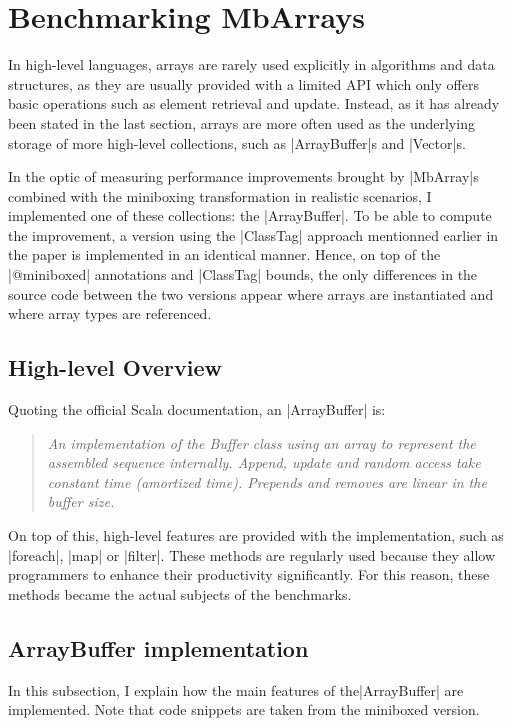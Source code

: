\section{Benchmarking MbArrays}
\label{sec:bench}

In high-level languages, arrays are rarely used explicitly in algorithms and data structures, as they are usually provided with a limited API which only offers basic operations such as element retrieval and update. Instead, as it has already been stated in the last section, arrays are more often used as the underlying storage of more high-level collections, such as |ArrayBuffer|s and |Vector|s.

In the optic of measuring performance improvements brought by |MbArray|s combined with the miniboxing transformation in realistic scenarios, I implemented one of these collections: the |ArrayBuffer|. To be able to compute the improvement, a version using the |ClassTag| approach mentionned earlier in the paper is implemented in an identical manner. Hence, on top of the |@miniboxed| annotations and |ClassTag| bounds, the only differences in the source code between the two versions appear where arrays are instantiated and where array types are referenced. 

\subsection{High-level Overview}

Quoting the official Scala documentation, an |ArrayBuffer| is: 
\begin{quote}
\textit{An implementation of the Buffer class using an array to represent the assembled sequence internally. Append, update and random access take constant time (amortized time). Prepends and removes are linear in the buffer size.} 
\end{quote}

On top of this, high-level features are provided with the implementation, such as |foreach|, |map| or |filter|. These methods are regularly used because they allow programmers to enhance their productivity significantly. For this reason, these methods became the actual subjects of the benchmarks.

\subsection{ArrayBuffer implementation}

In this subsection, I explain how the main features of the\linebreak |ArrayBuffer| are implemented. Note that code snippets are taken from the miniboxed version.

